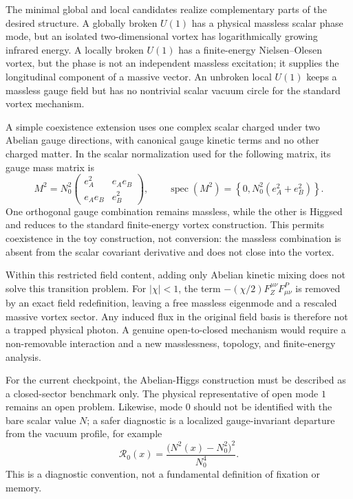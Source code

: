 \documentclass[11pt,a4paper]{article}
\begin{document}
The minimal global and local candidates realize complementary parts of the desired structure. A globally broken $U(1)$ has a physical massless scalar phase mode, but an isolated two-dimensional vortex has logarithmically growing infrared energy. A locally broken $U(1)$ has a finite-energy Nielsen--Olesen vortex, but the phase is not an independent massless excitation; it supplies the longitudinal component of a massive vector. An unbroken local $U(1)$ keeps a massless gauge field but has no nontrivial scalar vacuum circle for the standard vortex mechanism.

A simple coexistence extension uses one complex scalar charged under two Abelian gauge directions, with canonical gauge kinetic terms and no other charged matter. In the scalar normalization used for the following matrix, its gauge mass matrix is
\begin{equation}
M^2=N_0^2
\begin{pmatrix}
e_A^2 & e_Ae_B\\
e_Ae_B & e_B^2
\end{pmatrix},
\qquad
\operatorname{spec}(M^2)=\left\{0,N_0^2(e_A^2+e_B^2)\right\}.
\end{equation}
One orthogonal gauge combination remains massless, while the other is Higgsed and reduces to the standard finite-energy vortex construction. This permits coexistence in the toy construction, not conversion: the massless combination is absent from the scalar covariant derivative and does not close into the vortex.

Within this restricted field content, adding only Abelian kinetic mixing does not solve this transition problem. For $|\chi|<1$, the term $-(\chi/2)F_Z^{\mu\nu}F^P_{\mu\nu}$ is removed by an exact field redefinition, leaving a free massless eigenmode and a rescaled massive vortex sector. Any induced flux in the original field basis is therefore not a trapped physical photon. A genuine open-to-closed mechanism would require a non-removable interaction and a new masslessness, topology, and finite-energy analysis.

For the current checkpoint, the Abelian-Higgs construction must be described as a closed-sector benchmark only. The physical representative of open mode $1$ remains an open problem. Likewise, mode $0$ should not be identified with the bare scalar value $N$; a safer diagnostic is a localized gauge-invariant departure from the vacuum profile, for example
\begin{equation}
\mathcal{R}_0(x)
=\frac{\bigl(N^2(x)-N_0^2\bigr)^2}{N_0^4}.
\end{equation}
This is a diagnostic convention, not a fundamental definition of fixation or memory.
\end{document}
